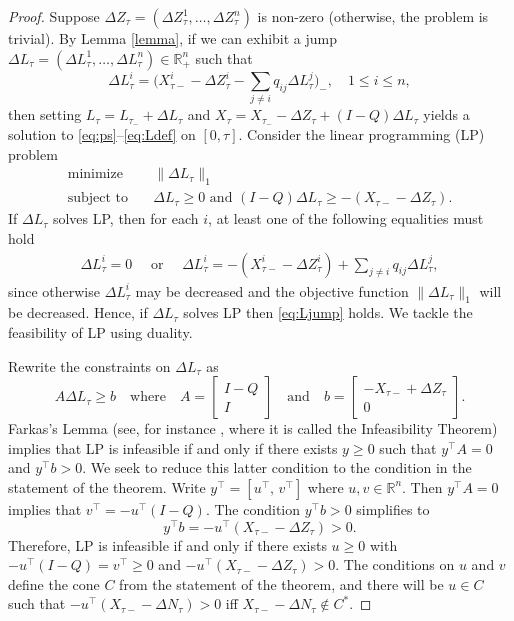 \documentclass[12pt]{article}
\newcommand{\R}{\mathbb{R}}
\newcommand{\lb}{\left}
\newcommand{\rb}{\right}
\theoremstyle{plain}
\theoremstyle{definition}
\theoremstyle{remark}
\begin{document}
\begin{proof} Suppose $\Delta Z_\tau=(\Delta Z^1_\tau,\dots,\Delta Z^n_\tau)$ is non-zero (otherwise, the problem is trivial). By Lemma \ref{lemma}, if we can exhibit a jump $\Delta L_\tau=(\Delta L^1_\tau,\dots,\Delta L^n_\tau)\in\R^n_+$ such that
\begin{equation}\label{eq:Ljump}
\Delta L^i_\tau=\bigg(X_{\tau-}^i-\Delta Z_\tau^i-\sum_{j\neq i}q_{ij}\Delta L_\tau^j\bigg)_-,\quad 1\le i\le n,
\end{equation}
then setting $L_\tau=L_{\tau_-}+\Delta L_\tau$ and $X_\tau=X_{\tau_-}-\Delta Z_\tau+(I-Q)\Delta L_\tau$ yields a solution to \eqref{eq:ps}--\eqref{eq:Ldef} on $[0,\tau]$. Consider the linear programming (LP) problem
\begin{align*}
\text{minimize} &\quad\|\Delta L_\tau\|_1\\
\text{subject to} &\quad\Delta L_\tau \ge 0\text{ and }(I-Q)\Delta L_{\tau}\ge -\lb(X_{\tau-}-\Delta Z_\tau\rb).
\end{align*}
If $\Delta L_\tau$ solves LP, then for each $i$, at least one of the following equalities must hold
\begin{align*}
\Delta L^i_\tau=0\quad\text{ or }\quad\Delta L^i_\tau=-\lb(X_{\tau-}^i-\Delta Z_\tau^i\rb)+\sum_{j\neq i}q_{ij}\Delta L_\tau^j,
\end{align*}
since otherwise $\Delta L^i_\tau$ may be decreased and the objective function $\|\Delta L_\tau\|_1$ will be decreased. Hence, if $\Delta L_\tau$ solves LP then \eqref{eq:Ljump} holds. We tackle the feasibility of LP using duality.

\medskip

Rewrite the constraints on $\Delta L_\tau$ as
\begin{equation*}
A\Delta L_\tau\ge b \quad \text{where}\quad  A= \begin{bmatrix}
    I-Q \\
    I
\end{bmatrix} 
\quad\text{and}\quad b = 
\begin{bmatrix}
    -X_{\tau-}+\Delta Z_\tau \\
    0
\end{bmatrix}.
\end{equation*}
Farkas's Lemma (see, for instance \cite[Theorem 2.1]{dantzig_linear_1997-1}, where it is called the Infeasibility Theorem) implies that LP is infeasible if and only if there exists $y\ge 0$ such that $y^\top A =0$ and $y^\top b >0$. We seek to reduce this latter condition to the condition in the statement of the theorem. Write $y^\top=[u^\top,\, v^\top]$ where $u,v\in \R^n$. Then $y^\top A =0$ implies that $v^\top=-u^\top(I-Q)$. The condition $y^\top b >0$ simplifies to
\begin{equation*}
y^\top b=-u^\top(X_{\tau-}-\Delta Z_\tau)>0.
\end{equation*}
Therefore, LP is infeasible if and only if there exists $u\ge 0$ with $-u^\top(I-Q)=v^\top\ge 0$ and $-u^\top(X_{\tau-}-\Delta Z_\tau)>0$. The conditions on $u$ and $v$ define the cone $C$ from the statement of the theorem, and there will be $u\in C$ such that $-u^\top(X_{\tau-}-\Delta N_\tau)>0$ iff $X_{\tau-}-\Delta N_\tau\notin C^*$. 


\end{proof}
\end{document}
